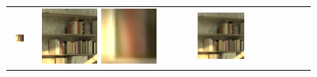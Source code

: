 \begin{figure}[ht!]
{\begin{tabular}{cccccc}
\begin{minipage}{0.180\textwidth}
            \includegraphics[width=0.46\textwidth, height=0.46\textwidth,cfbox=red 1pt 0pt]{img/qual/Bicycle/HR.LAM.png}
        \end{minipage} &
        \begin{minipage}{0.180\textwidth}
            \centering
            \includegraphics[width=0.46\textwidth, height=0.46\textwidth,cfbox=blue 1pt 0pt]{img/qual/Bicycle/IINet/SR.png}
            \includegraphics[width=0.46\textwidth, height=0.46\textwidth,cfbox=red 1pt 0pt]{img/qual/Bicycle/IINet/SR.LAM.png}
        \end{minipage} &
        \begin{minipage}{0.180\textwidth}
            \centering
            \includegraphics[width=0.46\textwidth, height=0.46\textwidth,cfbox=blue 1pt 0pt]{img/qual/Bicycle/DistgSSR/SR.png}

\end{minipage}
\end{tabular}}
\end{figure}
